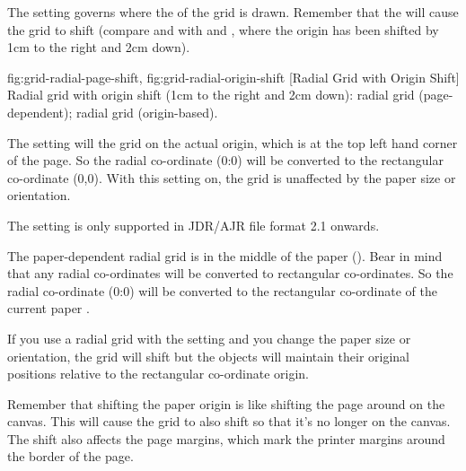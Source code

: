 The  setting governs where the
 of the grid is drawn. Remember that the
 will cause the grid to shift (compare
 and
 with
 and
, where the \gls{origin} has
been shifted by 1cm to the right and 2cm down).

{
  {fig:grid-radial-page-shift}{}{},
  {fig:grid-radial-origin-shift}{}{}
}
[Radial Grid with Origin Shift]
{Radial grid with origin shift (1cm to the right and 2cm down):
 radial grid (page-dependent);
 radial grid (origin-based).}


The  setting will 
the grid on the actual \gls{origin}, which is at the top left
hand corner of the page. So the radial co-ordinate (0:0) will be
converted to the rectangular co-ordinate (0,0). With this setting
on, the grid is unaffected by the paper size or orientation.

\begin{information}
The  setting is only supported in
\gls{JDR}\slash\gls{AJR} file format 2.1 onwards.
\end{information}


The paper-dependent radial grid is  in the middle of
the paper (). Bear in mind that any
radial co-ordinates will be converted to rectangular co-ordinates.
So the radial co-ordinate (0:0) will be converted to the rectangular
co-ordinate of the current paper .

\begin{important}
If you use a radial grid with the 
setting and you change the paper size or orientation,
the grid will shift but the \glspl{object} will maintain
their original positions relative to the rectangular co-ordinate
\gls{origin}.
\end{important}

Remember that shifting the paper \gls{origin} is like shifting the
page around on the \gls{canvas}. This will cause the grid to also
shift so that it's no longer  on the \gls{canvas}.
The shift also affects the page margins, which mark the printer
margins around the border of the page.

